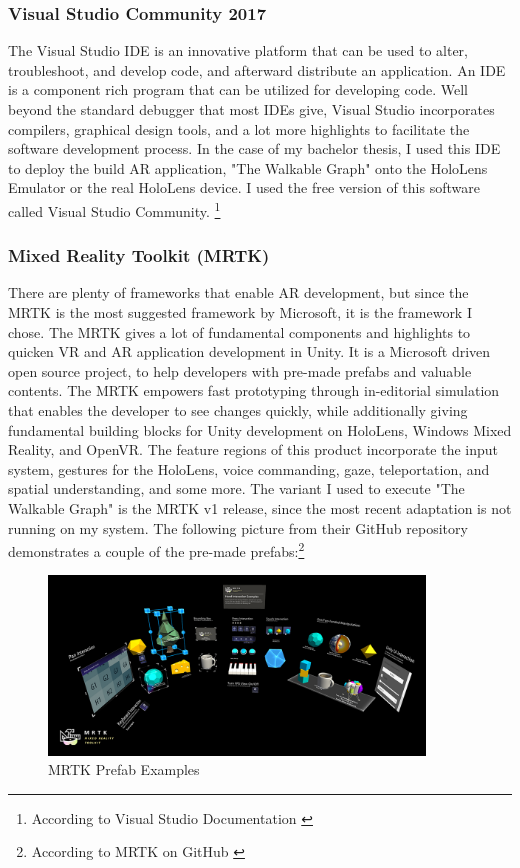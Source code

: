 \documentclass[12pt,a4paper,oneside,american,parskip=half]{article}
\begin{document}
\begin{justify}
\begin{normalsize}
\subsubsection{Visual Studio Community 2017}
The Visual Studio IDE is an innovative platform that can be used to alter, troubleshoot, and develop code, and afterward distribute an application. 
An IDE is a component rich program that can be utilized for developing code.
Well beyond the standard debugger that most IDEs give, Visual Studio incorporates compilers, graphical design tools, and a lot more highlights to facilitate the software development process. In the case of my bachelor thesis, I used this IDE to deploy the build AR application, "The Walkable Graph" onto the HoloLens Emulator or the real HoloLens device. I used the free version of this software called Visual Studio Community. \footnote{According to Visual Studio Documentation \cite{vsstudio}}

\subsubsection{Mixed Reality Toolkit (MRTK)}
There are plenty of frameworks that enable AR development, but since the MRTK is the most suggested framework by Microsoft, it is the framework I chose.
The MRTK gives a lot of fundamental components and highlights to quicken VR and AR application development in Unity. It is a Microsoft driven open source project, to help developers with pre-made prefabs and valuable contents. The MRTK empowers fast prototyping through in-editorial simulation that enables the developer to see changes quickly, while additionally giving fundamental building blocks for Unity development on HoloLens, Windows Mixed Reality, and OpenVR. The feature regions of this product incorporate the input system, gestures for the HoloLens, voice commanding, gaze, teleportation, and spatial understanding, and some more. The variant I used to execute "The Walkable Graph" is the MRTK v1 release, since the most recent adaptation is not running on my system. The following picture from their GitHub repository demonstrates a couple of the pre-made prefabs:\footnote{According to MRTK on GitHub \cite{mrtk}}
\clearpage

\begin{figure}[h]
\centering
\includegraphics[width=10cm]{mrtk.png}
\caption{MRTK Prefab Examples \cite{mrtk}}
\end{figure} \par



\end{normalsize}
\end{justify}
\end{document}
